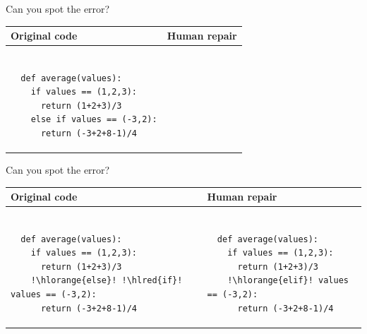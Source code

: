 \documentclass{beamer}
\begin{document}
\begin{frame}[fragile]{Can you spot the error?}
  \begin{center}
    \begin{tabular}{|m{5.5cm}|m{5.5cm}|}
      \hline \rule{0pt}{2.5ex}\textbf{Original code}\rule[-1ex]{0pt}{2ex} &  \rule{0pt}{2.5ex}\textbf{Human repair}\rule[-1ex]{0pt}{2ex} \\\hline
      \begin{lstlisting}[escapechar=!, basicstyle=\linespread{1.3}\ttfamily\footnotesize]

  def average(values):
    if values == (1,2,3):
      return (1+2+3)/3
    else if values == (-3,2):
      return (-3+2+8-1)/4

      \end{lstlisting} & \begin{lstlisting}[escapechar=!, basicstyle=\linespread{1.3}\ttfamily\footnotesize]

      \end{lstlisting} \\\hline
    \end{tabular}
  \end{center}
\end{frame}

\begin{frame}[fragile]{Can you spot the error?}
  \begin{center}
    \begin{tabular}{|m{5.5cm}|m{5.5cm}|}
      \hline \rule{0pt}{2.5ex}\textbf{Original code}\rule[-1ex]{0pt}{2ex} &  \rule{0pt}{2.5ex}\textbf{Human repair}\rule[-1ex]{0pt}{2ex} \\\hline
      \begin{lstlisting}[escapechar=!, basicstyle=\linespread{1.3}\ttfamily\footnotesize]

  def average(values):
    if values == (1,2,3):
      return (1+2+3)/3
    !\hlorange{else}! !\hlred{if}! values == (-3,2):
      return (-3+2+8-1)/4

      \end{lstlisting} & \begin{lstlisting}[escapechar=!, basicstyle=\linespread{1.3}\ttfamily\footnotesize]

  def average(values):
    if values == (1,2,3):
      return (1+2+3)/3
    !\hlorange{elif}! values == (-3,2):
      return (-3+2+8-1)/4

      \end{lstlisting} \\\hline
    \end{tabular}
  \end{center}
\end{frame}
\end{document}
